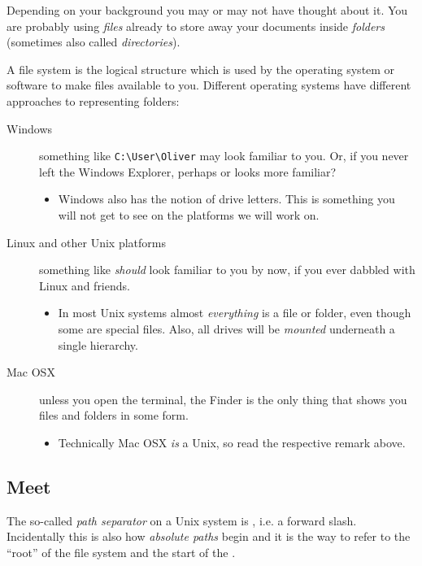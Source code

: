 \documentclass{olli-handout}
\begin{document}
Depending on your background you may or may not have thought about it. You are probably using \emph{files} already to store away your documents inside \emph{folders} (sometimes also called \emph{directories}).

A file system is the logical structure which is used by the operating system or software to make files available to you. Different operating systems have different approaches to representing folders:

\begin{description}
	\item[Windows] something like \verb|C:\User\Oliver| may look familiar to you. Or, if you never left the Windows Explorer, perhaps  or  looks more familiar?
    \begin{itemize}
        \item[\olliHandLeft] Windows also has the notion of drive letters. This is something you will not get to see on the platforms we will work on.
    \end{itemize}
	\item[Linux and other Unix platforms] something like  \emph{should} look familiar to you by now, if you ever dabbled with Linux and friends.
    \begin{itemize}
    	\item[\olliHandLeft] In most Unix systems almost \emph{everything} is a file or folder, even though some are special files. Also, all drives will be \emph{mounted} underneath a single hierarchy.
    \end{itemize}
	\item[Mac OSX] unless you open the terminal, the Finder is the only thing that shows you files and folders in some form.
    \begin{itemize}
        \item[\olliHandLeft] Technically Mac OSX \emph{is} a Unix, so read the respective remark above.
    \end{itemize}
\end{description}

\subsection{Meet \TT{/}}

The so-called \emph{path separator} on a Unix system is \TT{/}, i.e. a forward slash. Incidentally this is also how \emph{absolute paths} begin and it is the way to refer to the ``root'' of the file system and the start of the .
\end{document}
